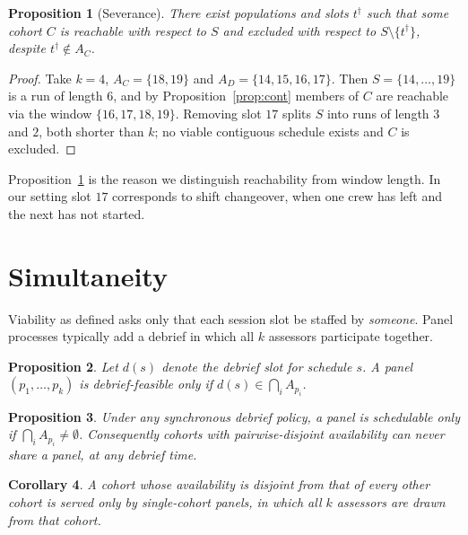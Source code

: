 \documentclass[11pt]{article}
\newtheorem{proposition}{Proposition}
\newtheorem{corollary}[proposition]{Corollary}
\theoremstyle{definition}
\begin{document}
\begin{proposition}[Severance]
\label{prop:sever}
There exist populations and slots $t^\dagger$ such that some cohort $C$ is reachable with
respect to $S$ and excluded with respect to $S\setminus\{t^\dagger\}$, despite
$t^\dagger \notin A_C$.
\end{proposition}

\begin{proof}
Take $k=4$, $A_C=\{18,19\}$ and $A_D=\{14,15,16,17\}$. Then $S=\{14,\dots,19\}$ is a run
of length $6$, and by Proposition~\ref{prop:cont} members of $C$ are reachable via the
window $\{16,17,18,19\}$. Removing slot $17$ splits $S$ into runs of length $3$ and $2$,
both shorter than $k$; no viable contiguous schedule exists and $C$ is excluded.
\end{proof}

Proposition~\ref{prop:sever} is the reason we distinguish reachability from window
length. In our setting slot $17$ corresponds to shift changeover, when one crew has left
and the next has not started.

\section{Simultaneity}

Viability as defined asks only that each session slot be staffed by \emph{someone}. Panel
processes typically add a debrief in which all $k$ assessors participate together.

\begin{proposition}
\label{prop:debrief}
Let $d(s)$ denote the debrief slot for schedule $s$. A panel $(p_1,\dots,p_k)$ is
debrief-feasible only if $d(s) \in \bigcap_i A_{p_i}$.
\end{proposition}

\begin{proposition}
\label{prop:disjoint}
Under any synchronous debrief policy, a panel is schedulable only if
$\bigcap_i A_{p_i} \neq \emptyset$. Consequently cohorts with pairwise-disjoint
availability can never share a panel, at any debrief time.
\end{proposition}

\begin{corollary}
\label{cor:single}
A cohort whose availability is disjoint from that of every other cohort is served only by
\emph{single-cohort} panels, in which all $k$ assessors are drawn from that cohort.
\end{corollary}
\end{document}
